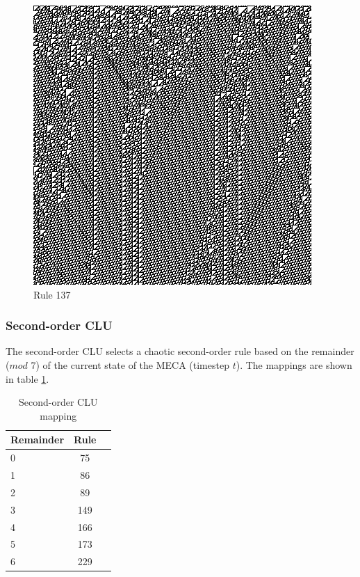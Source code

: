 \documentclass{article}
\begin{document}
\begin{figure}[H]
  \begin{center}
    \begin{minipage}{0.48\textwidth}
      \caption{Rule 137}
      \label{fig:figure3}
      \centering
      \includegraphics[scale=.5]{137.png}
    \end{minipage}
  \end{center}
\end{figure}

\subsubsection{Second-order CLU}

The second-order CLU selects a chaotic second-order rule based on the remainder ($mod$ 7) of the current state of the MECA (timestep $t$). The mappings are shown in table \ref{tab:table2}.

\begin{table}[h!]
  \begin{center}
    \caption{Second-order CLU mapping}
    \label{tab:table2}
    \begin{tabular}{l|c|r} %
      \textbf{Remainder} & \textbf{Rule}\\
      \hline
      0 & 75\\
      1 & 86\\
      2 & 89\\
      3 & 149\\
      4 & 166\\
      5 & 173\\
      6 & 229\\
    \end{tabular}
  \end{center}
\end{table}
\end{document}

